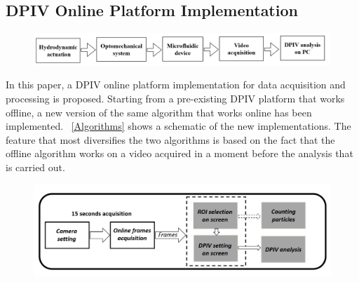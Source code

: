 \documentclass[journal]{IEEEtran}
\theoremstyle{definition}
\theoremstyle{remark}
\begin{document}
\subsection{DPIV Online Platform Implementation}\label{sec:method}

\begin{figure}[!h]
	\centering
	\includegraphics[width=1\columnwidth]{images/Platform}
\end{figure}

In this paper, a DPIV online platform implementation for data acquisition and processing is proposed. Starting from a pre-existing DPIV platform that works offline, a new version of the same algorithm
that works online has been implemented. ~\fig\ref{Algorithms} shows a schematic of the new implementations. The feature that most diversifies the two algorithms is based on the fact that the offline algorithm works on a video acquired in a moment before the analysis that is carried out.



\begin{figure}[!h]
	\centering
	\includegraphics[width=1\columnwidth]{images/algorithm}
\end{figure}
\end{document}
